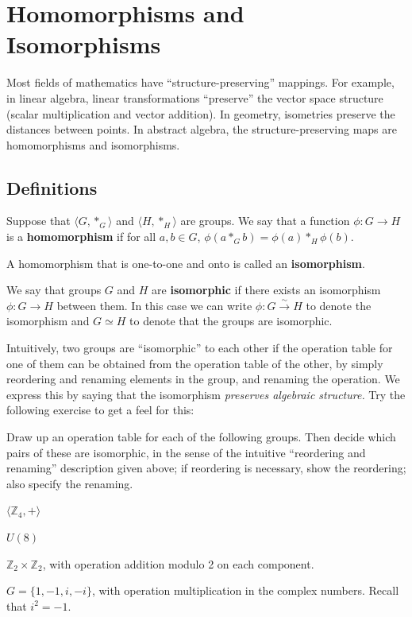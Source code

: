 \chapter{Homomorphisms and Isomorphisms}
Most fields of mathematics have ``structure-preserving'' mappings. For example, in linear algebra, linear transformations ``preserve'' the vector space structure (scalar multiplication and vector addition). In geometry, isometries preserve the distances between points. In abstract algebra, the structure-preserving maps are homomorphisms and isomorphisms.

\section{Definitions}

\begin{definition}
Suppose that
\(\langle G, *_{G} \rangle \)
and \(\langle H, *_{H} \rangle \) are groups. We say that a function
\(\phi : G \longrightarrow H\) is a \textbf{homomorphism} if for all \(a, b \in G\), \(\phi(a *_{G} b) = \phi(a) *_{H} \phi(b) \).

A homomorphism that is one-to-one and onto is called an \textbf{isomorphism}.
\begin{annotation}
\end{annotation}
\end{definition}

We say that groups \(G\) and \(H\) are \textbf{isomorphic} if there exists an isomorphism \(\phi : G \longrightarrow H\) between them. In this case we can write \(\phi : G \stackrel{\sim}{\longrightarrow} H\) to denote the isomorphism and \(G \simeq H\) to denote that the groups are isomorphic.

Intuitively, two groups are ``isomorphic'' to each other if the operation table for one of them can be obtained from the operation table of the other, by simply reordering and renaming elements in the group, and renaming the operation. We express this by saying that the isomorphism \emph{preserves algebraic structure.} Try the following exercise to get a feel for this:

\begin{problem}
Draw up an operation table for each of the following groups. Then decide which pairs of these are isomorphic, in the sense of the intuitive ``reordering and renaming'' description given above; if reordering is necessary, show the reordering; also specify the renaming.
\begin{problemparts}
  \item \( \langle \mathbb{Z}_4, + \rangle  \)
  \item \( U(8) \)
  \item \( \mathbb{Z}_2 \times \mathbb{Z}_2 \), with operation addition modulo 2 on each component.
  \item \( G = \{1, -1, i, -i \} \), with operation multiplication in the complex numbers. Recall that \(i^2 = -1\).
\end{problemparts}
\end{problem}


